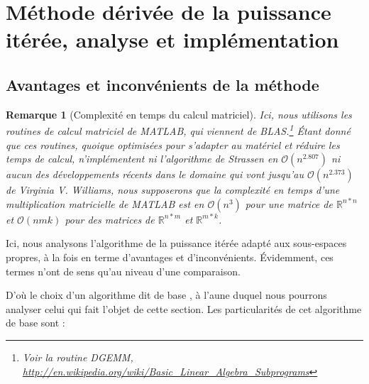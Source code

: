 \documentclass[a4paper,12pt]{article}
\newtheorem*{remark}{Remarque}
\begin{document}
\section{Méthode dérivée de la puissance itérée, analyse et implémentation}

    \subsection{Avantages et inconvénients de la méthode}

        \begin{remark}[Complexité en temps du calcul matriciel]
        Ici, nous utilisons les routines de calcul matriciel de MATLAB, qui
        viennent de BLAS.\footnote{Voir la routine DGEMM,
        \url{http://en.wikipedia.org/wiki/Basic_Linear_Algebra_Subprograms}}
        Étant donné que ces routines, quoique optimisées pour s'adapter au
        matériel et réduire les temps de calcul, n'implémentent ni l'algorithme
        de Strassen en $\mathcal{O}(n^{2.807})$ ni aucun des développements
        récents dans le domaine qui vont jusqu'au $\mathcal{O}(n^{2.373})$ de
        Virginia V. Williams, nous supposerons que la complexité en temps d'une
        multiplication matricielle de MATLAB est en $\mathcal{O}(n^3)$ pour une
        matrice de $\mathbb{R}^{n*n}$ et $\mathcal{O}(nmk)$ pour des matrices de
        $\mathbb{R}^{n*m}$ et $\mathbb{R}^{m*k}$.
        \end{remark}

        Ici, nous analysons l'algorithme de la puissance itérée adapté aux
        sous-espaces propres, à la fois en terme d'avantages et d'inconvénients.
        Évidemment, ces termes n'ont de sens qu'au niveau d'une comparaison.

        D'où le choix d'un algorithme dit \og de base \fg, à l'aune duquel nous
        pourrons analyser celui qui fait l'objet de cette section.  Les
        particularités de cet algorithme \og de base \fg sont :
\end{document}
